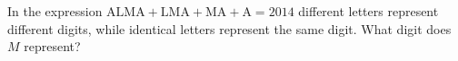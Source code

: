 In the expression $\text{ALMA}+\text{LMA}+\text{MA}+\text{A}=2014$ different letters represent different digits, while identical letters represent the same digit. What digit does $M$ represent?
